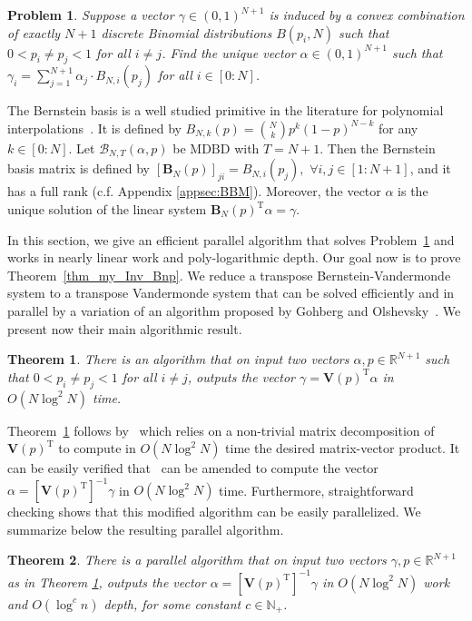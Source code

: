 \documentclass[11pt]{article}
\newcommand{\MDBD}{\mathrm{MDBD}}
\newcommand{\BNTap}{\mathcal{B}_{N,T}(\alpha,p)}
\newcommand{\Vp}{\mathbf{V}(p)}
\newcommand{\mB}{\mathbf{B}}
\newcommand{\N}{\mathbb{N}}
\newcommand{\R}{\mathbb{R}}
\newcommand{\rot}{\mathrm{T}}
\newtheorem{problem}{Problem}
\newtheorem{thm}{Theorem}  \newtheorem{fact}[thm]{Fact}
\numberwithin{thm}{section}
\begin{document}
\begin{problem}\label{prob_ExN_Bnk}
Suppose a vector $\gamma\in(0,1)^{N+1}$ is
induced by a convex combination of exactly $N+1$ discrete Binomial
distributions $B(p_{i},N)$ such that $0<p_{i}\neq p_{j}<1$ for all $i\neq j$.
Find the unique vector $\alpha\in(0,1)^{N+1}$ such that $\gamma_{i}=\sum_{j=1}^{N+1}\alpha_{j} \cdot B_{N,i}(p_{j})$
for all $i\in[0:N]$.
\end{problem}

The Bernstein basis is a well studied primitive in the literature for polynomial interpolations~\cite{UN03,CUN02}. It is defined by $B_{N,k}(p)={N \choose k}p^{k}(1-p)^{N-k}$
for any $k\in[0:N]$. Let $\BNTap$ be $\MDBD$ with $T=N+1$. Then the Bernstein basis matrix is defined by $[\mB_{N}(p)]_{ji}=B_{N,i}(p_{j}),\,\,\forall i,j\in[1:N+1]$, and it has a full rank (c.f. Appendix \ref{appsec:BBM}). Moreover, the vector $\alpha$ is the unique solution of the linear system $\mB_{N}(p)^{\rot}\alpha=\gamma$.


In this section, we give an efficient parallel algorithm that solves Problem~\ref{prob_ExN_Bnk} and works in nearly linear work and poly-logarithmic depth. Our goal now is to prove Theorem~\ref{thm_my_Inv_Bnp}. We reduce a transpose Bernstein-Vandermonde system to a transpose Vandermonde system that can be solved efficiently and in parallel by a variation of an algorithm proposed by Gohberg and Olshevsky~\cite{GO94}. We present now their main algorithmic result.

\begin{thm}\cite{GO94}\label{thm_inv_VT}
There is an algorithm that on input two vectors
$\alpha,p\in\R^{N+1}$ such that $0<p_{i}\neq p_{j}<1$ for all
$i\neq j$, outputs the vector $\gamma=\Vp^{\rot}\alpha$ in $O(N\log^{2}N)$ time.
\end{thm}

Theorem~\ref{thm_inv_VT} follows by~\cite[Algorithm 2.1]{GO94} which relies on a non-trivial matrix decomposition of $\Vp^{\rot}$ to compute in $O(N\log^{2}N)$ time the desired  matrix-vector product. It can be easily verified that~\cite[Algorithm 2.1]{GO94} can be amended to compute the vector $\alpha=[\Vp^{\rot}]^{-1}\gamma$ in $O(N\log^{2}N)$ time. Furthermore, straightforward checking shows that this modified algorithm can be easily parallelized. We summarize below the resulting parallel algorithm.


\begin{thm}\cite{GO94}\label{thm_inv_pl_VT}
There is a parallel algorithm that on input two vectors $\gamma,p \in\R^{N+1}$ as in Theorem \ref{thm_inv_VT}, outputs the vector $\alpha=[\Vp^{\rot}]^{-1}\gamma$ in $O(N\log^{2}N)$ work and $O(\log^{c}n)$ depth, for some constant $c\in\N_+$.
\end{thm}
\end{document}
